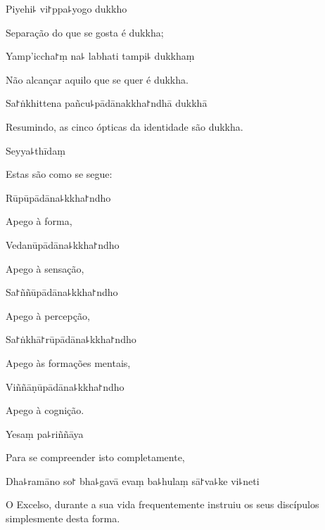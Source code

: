 Piyehi꜕ vi꜓ppa꜕yogo dukkho

\begin{english}
  Separação do que se gosta é dukkha;
\end{english}

Yamp'iccha꜓ṃ na꜕ labhati tampi꜕ dukkhaṃ

\begin{english}
  Não alcançar aquilo que se quer é dukkha.
\end{english}

Sa꜓ṅkhittena pañcu꜕pādānakkha꜓ndhā dukkhā

\begin{english}
  Resumindo, as cinco ópticas da identidade são dukkha.
\end{english}

Seyya꜕thīdaṃ

\begin{english}
  Estas são como se segue:
\end{english}

Rūpūpādāna꜕kkha꜓ndho

\begin{english}
  Apego à forma,
\end{english}

Vedanūpādāna꜕kkha꜓ndho

\begin{english}
  Apego à sensação,
\end{english}

Sa꜓ññūpādāna꜕kkha꜓ndho

\begin{english}
  Apego à percepção,
\end{english}

Sa꜓ṅkhā꜓rūpādāna꜕kkha꜓ndho

\begin{english}
  Apego às formações mentais,
\end{english}

Viññāṇūpādāna꜕kkha꜓ndho

\begin{english}
  Apego à cognição.
\end{english}

Yesaṃ pa꜕riññāya

\begin{english}
  Para se compreender isto completamente,
\end{english}

Dha꜕ramāno so꜓ bha꜕gavā evaṃ ba꜕hulaṃ sā꜓va꜕ke vi꜕neti

\begin{english}
  O Excelso, durante a sua vida frequentemente instruiu os seus discípulos \\simplesmente desta forma.
\end{english}

